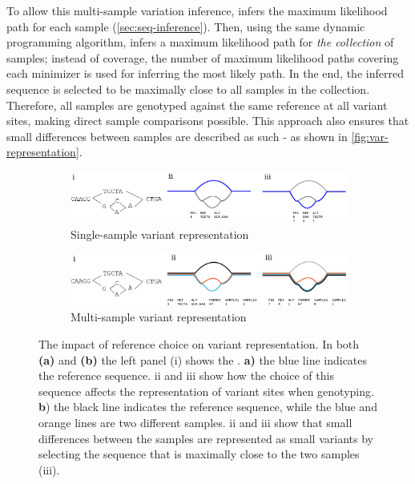 To allow this multi-sample variation inference, \pandora{} infers the maximum likelihood path for each sample (\autoref{sec:seq-inference}). Then, using the same dynamic programming algorithm, \pandora{} infers a maximum likelihood path for \emph{the collection} of samples; instead of \kmer{} coverage, the number of maximum likelihood paths covering each minimizer is used for inferring the most likely path. In the end, the inferred sequence is selected to be maximally close to all samples in the collection. Therefore, all samples are genotyped against the same reference at all variant sites, making direct sample comparisons possible. This approach also ensures that small differences between samples are described as such - as shown in \autoref{fig:var-representation}.

\begin{figure}
     \centering
     \begin{subfigure}[b]{0.95\textwidth}
        \includegraphics[width=0.95\columnwidth]{Chapter0/Figs/map_variation_representation.png}
        \centering
        \caption{Single-sample variant representation}
        \label{fig:map-var-representation}
     \end{subfigure}
     \begin{subfigure}[b]{0.95\textwidth}
         \centering
        \includegraphics[width=0.95\columnwidth]{Chapter0/Figs/variant_representation.png}
         \caption{Multi-sample variant representation}
         \label{fig:var-representation}
     \end{subfigure}
     \caption{The impact of reference choice on variant representation. In both \textbf{(a)} and \textbf{(b)} the left panel (i) shows the \prg{}. \textbf{a)} the blue line indicates the reference sequence. ii and iii show how the choice of this sequence affects the representation of variant sites when genotyping. \textbf{b}) the black line indicates the reference sequence, while the blue and orange lines are two different samples. ii and iii show that small differences between the samples are represented as small variants by selecting the sequence that is maximally close to the two samples (iii).}
     \label{fig:pandora-var-representation}
\end{figure}

